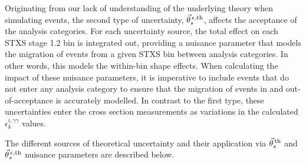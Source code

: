 Originating from our lack of understanding of the underlying theory when simulating events, the second type of uncertainty, $\vec{\theta}^{\,\epsilon,{\rm{th}}}_{s}$, affects the acceptance of the analysis categories. For each uncertainty source, the total effect on each STXS stage 1.2 bin is integrated out, providing a nuisance parameter that models the migration of events from a given STXS bin between analysis categories. In other words, this models the within-bin shape effects. When calculating the impact of these nuisance parameters, it is imperative to include events that do not enter any analysis category to ensure that the migration of events in and out-of-acceptance is accurately modelled. In contrast to the first type, these uncertainties enter the cross section measurements as variations in the calculated $\epsilon^{i,\gamma\gamma}_{k}$ values.

The different sources of theoretical uncertainty and their application via $\vec{\theta}^{\,\rm{th}}_{s}$ and $\vec{\theta}^{\,\epsilon,{\rm{th}}}_{s}$ nuisance parameters are described below.

